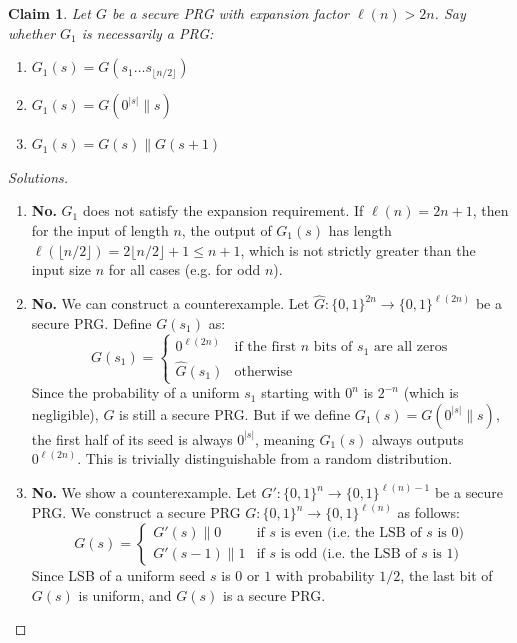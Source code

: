 \documentclass{article}
\newtheorem{claim}{Claim}
\begin{document}
\begin{claim}
Let $G$ be a secure PRG with expansion factor $\ell(n) > 2n$. Say whether $G_1$ is necessarily a PRG:
\begin{enumerate}
    \item $G_1(s) = G(s_1 \dots s_{\lfloor n/2 \rfloor})$
    \item $G_1(s) = G(0^{|s|} \parallel s)$
    \item $G_1(s) = G(s) \parallel G(s+1)$
\end{enumerate}
\end{claim}
\begin{proof}[Solutions]
\hfill
\begin{enumerate}
    \item \textbf{No.} $G_1$ does not satisfy the expansion requirement. If $\ell(n) = 2n + 1$, then for the input of length $n$, the output of $G_1(s)$ has length $\ell(\lfloor n/2 \rfloor) = 2\lfloor n/2 \rfloor + 1 \leq n + 1$, which is not strictly greater than the input size $n$ for all cases (e.g. for odd $n$).
    
    \item \textbf{No.} We can construct a counterexample. Let $\hat{G} : \{0,1\}^{2n} \to \{0,1\}^{\ell(2n)}$ be a secure PRG. Define $G(s_1)$ as:
    \[
    G(s_1) = \begin{cases}
    0^{\ell(2n)} & \text{if the first } n \text{ bits of } s_1 \text{ are all zeros} \\
    \hat{G}(s_1) & \text{otherwise}
    \end{cases}
    \]
    Since the probability of a uniform $s_1$ starting with $0^n$ is $2^{-n}$ (which is negligible), $G$ is still a secure PRG. But if we define $G_1(s) = G(0^{|s|} \parallel s)$, the first half of its seed is always $0^{|s|}$, meaning $G_1(s)$ always outputs $0^{\ell(2n)}$. This is trivially distinguishable from a random distribution.
    
    \item \textbf{No.} We show a counterexample. Let $G' : \{0,1\}^n \to \{0,1\}^{\ell(n)-1}$ be a secure PRG. We construct a secure PRG $G : \{0,1\}^n \to \{0,1\}^{\ell(n)}$ as follows:
    \[
    G(s) = \begin{cases}
    G'(s) \parallel 0 & \text{if } s \text{ is even (i.e. the LSB of } s \text{ is } 0\text{)} \\
    G'(s-1) \parallel 1 & \text{if } s \text{ is odd (i.e. the LSB of } s \text{ is } 1\text{)}
    \end{cases}
    \]
    Since LSB of a uniform seed $s$ is $0$ or $1$ with probability $1/2$, the last bit of $G(s)$ is uniform, and $G(s)$ is a secure PRG.
    

\end{enumerate}
\end{proof}
\end{document}
